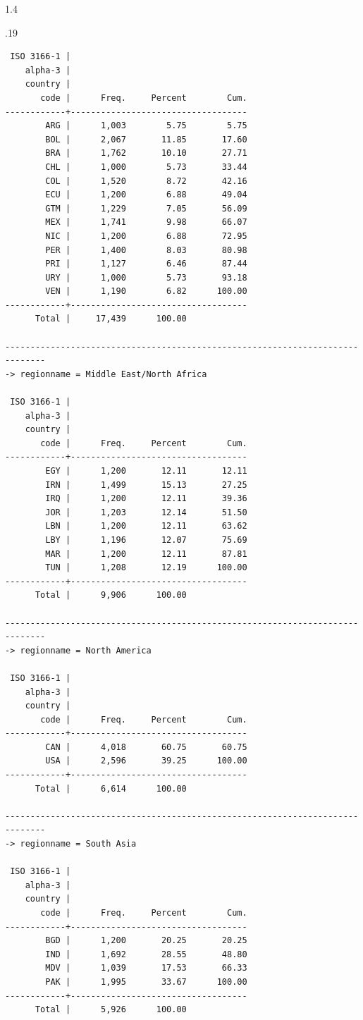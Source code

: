 \documentclass[10pt, letterpaper]{article}
\begin{document}
\begin{spacing}{1.4}
\begin{scriptsize}
\begin{spacing}{.19}
\begin{verbatim}
 ISO 3166-1 |
    alpha-3 |
    country |
       code |      Freq.     Percent        Cum.
------------+-----------------------------------
        ARG |      1,003        5.75        5.75
        BOL |      2,067       11.85       17.60
        BRA |      1,762       10.10       27.71
        CHL |      1,000        5.73       33.44
        COL |      1,520        8.72       42.16
        ECU |      1,200        6.88       49.04
        GTM |      1,229        7.05       56.09
        MEX |      1,741        9.98       66.07
        NIC |      1,200        6.88       72.95
        PER |      1,400        8.03       80.98
        PRI |      1,127        6.46       87.44
        URY |      1,000        5.73       93.18
        VEN |      1,190        6.82      100.00
------------+-----------------------------------
      Total |     17,439      100.00

------------------------------------------------------------------------------
-> regionname = Middle East/North Africa

 ISO 3166-1 |
    alpha-3 |
    country |
       code |      Freq.     Percent        Cum.
------------+-----------------------------------
        EGY |      1,200       12.11       12.11
        IRN |      1,499       15.13       27.25
        IRQ |      1,200       12.11       39.36
        JOR |      1,203       12.14       51.50
        LBN |      1,200       12.11       63.62
        LBY |      1,196       12.07       75.69
        MAR |      1,200       12.11       87.81
        TUN |      1,208       12.19      100.00
------------+-----------------------------------
      Total |      9,906      100.00

------------------------------------------------------------------------------
-> regionname = North America

 ISO 3166-1 |
    alpha-3 |
    country |
       code |      Freq.     Percent        Cum.
------------+-----------------------------------
        CAN |      4,018       60.75       60.75
        USA |      2,596       39.25      100.00
------------+-----------------------------------
      Total |      6,614      100.00

------------------------------------------------------------------------------
-> regionname = South Asia

 ISO 3166-1 |
    alpha-3 |
    country |
       code |      Freq.     Percent        Cum.
------------+-----------------------------------
        BGD |      1,200       20.25       20.25
        IND |      1,692       28.55       48.80
        MDV |      1,039       17.53       66.33
        PAK |      1,995       33.67      100.00
------------+-----------------------------------
      Total |      5,926      100.00


\end{verbatim}
\end{spacing}
\end{scriptsize}
\end{spacing}
\end{document}
